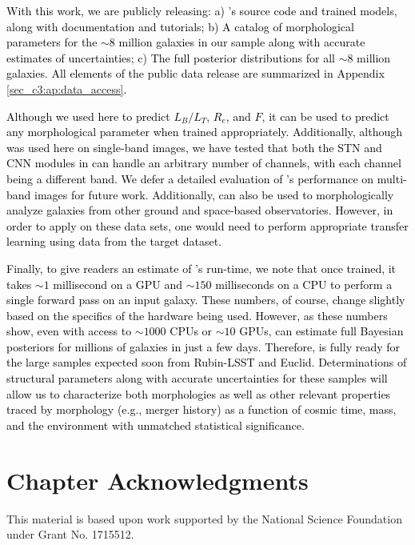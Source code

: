 \textcolor{black}{With this work, we are publicly releasing: a) \gampen{}'s source code and trained models, along with documentation and tutorials; b) A catalog of morphological parameters for the $\sim8$ million galaxies in our sample along with accurate estimates of uncertainties; c) The full posterior distributions for all $\sim8$ million galaxies. All elements of the public data release are summarized in Appendix \ref{sec_c3:ap:data_access}.}

\textcolor{black}{Although we used \gampen{} here to predict $L_B/L_T$, $R_e$, and $F$, it can be used to predict any morphological parameter when trained appropriately. Additionally, although \gampen{} was used here on single-band images, we have tested that both the STN and CNN modules in \gampen{} can handle an arbitrary number of channels, with each channel being a different band. We defer a detailed evaluation of \gampen{}'s performance on multi-band images for future work. Additionally, \gampen{} can also be used to morphologically analyze galaxies from other ground and space-based observatories. However, in order to apply \gampen{} on these data sets, one would need to perform appropriate transfer learning using data from the target dataset.}

\textcolor{black}{Finally, to give readers an estimate of \gampen{}'s run-time, we note that once trained, it takes \gampen{} $\sim1$ millisecond on a GPU and $\sim150$ milliseconds on a CPU to perform a single forward pass on an input galaxy. These numbers, of course, change slightly based on the specifics of the hardware being used. However, as these numbers show, even with access to $\sim1000$ CPUs or $\sim10$ GPUs, \gampen{} can estimate full Bayesian posteriors for millions of galaxies in just a few days. Therefore, \gampen{} is fully ready for the large samples expected soon from Rubin-LSST and Euclid. Determinations of structural parameters along with accurate uncertainties for these samples will allow us to characterize both morphologies as well as other relevant properties traced by morphology (e.g., merger history) as a function of cosmic time, mass, and the environment with unmatched statistical significance.}

\section*{Chapter Acknowledgments}
This material is based upon work supported by the National Science Foundation under Grant No. 1715512.

